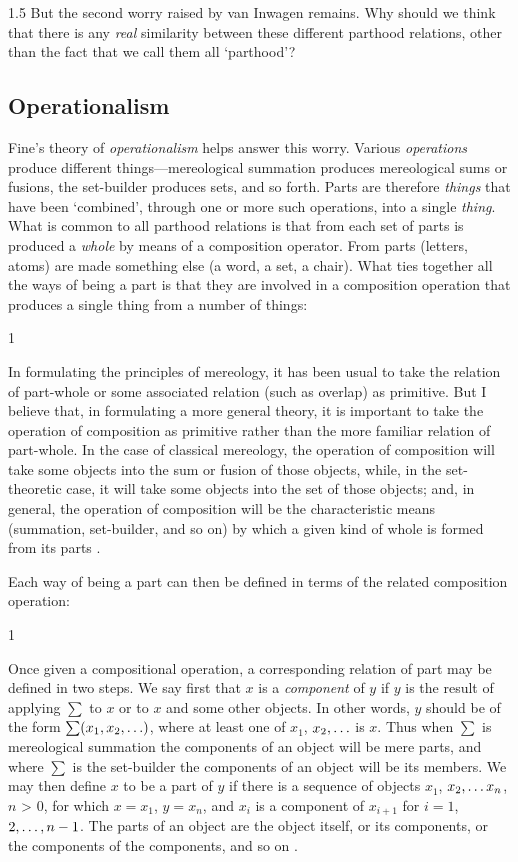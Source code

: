 \documentclass[11pt]{article}
\newenvironment{squote}{%
\begin{spacing}{1}
\begin{list}{}{%
\setlength{\labelwidth}{0pt}%
\rightmargin\leftmargin%
}
\item\relax
}{%
\end{list}%
\end{spacing}
}
\begin{document}
\begin{spacing}{1.5}
But the second worry raised by van Inwagen remains.  Why should we
think that there is any {\em real} similarity between these different
parthood relations, other than the fact that we call them all
`parthood'?

\subsection{Operationalism}
\label{operation}
Fine's theory of {\em operationalism} helps answer this worry.
Various {\em operations} produce different things---mereological
summation produces mereological sums or fusions, the set-builder
produces sets, and so forth.  Parts are therefore {\em things} that
have been `combined', through one or more such operations, into a
single {\em thing}.  What is common to all parthood relations is that
from each set of parts is produced a {\em whole} by means of a
composition operator.  From parts (letters, atoms) are made something
else (a word, a set, a chair).  What ties together all the ways of
being a part is that they are involved in a composition operation that
produces a single thing from a number of things:

\begin{squote}
In formulating the principles of mereology, it has been usual to take
the relation of part-whole or some associated relation (such as
overlap) as primitive.  But I believe that, in formulating a more
general theory, it is important to take the operation of composition
as primitive rather than the more familiar relation of part-whole.  In
the case of classical mereology, the operation of composition will
take some objects into the sum or fusion of those objects, while, in
the set-theoretic case, it will take some objects into the set of
those objects; and, in general, the operation of composition will be
the characteristic means (summation, set-builder, and so on) by which
a given kind of whole is formed from its parts \citep[565]{fine2010}.
\end{squote}

Each way of being a part can then be defined in terms of the related
composition operation:

\begin{squote}
Once given a compositional operation, a corresponding relation of part
may be defined in two steps.  We say first that $x$ is a {\em
  component} of $y$ if $y$ is the result of applying $\sum$ to $x$ or
to $x$ and some other objects.  In other words, $y$ should be of the
form $\sum (x_{1}, x_{2}, \mathellipsis )$, where at least one of
$x_1$, $x_2, \mathellipsis$ is $x$.  Thus when $\sum$ is mereological
summation the components of an object will be mere parts, and where
$\sum$ is the set-builder the components of an object will be its
members.  We may then define $x$ to be a part of $y$ if there is a
sequence of objects $x_1$, $x_2, \mathellipsis x_n$, $n$
\textgreater{} $0$, for which $x = x_1$, $y = x_n$, and $x_i$ is a
component of $x_{i+1}$ for $i = 1$, $2, \mathellipsis, n-1$. The parts
of an object are the object itself, or its components, or the
components of the components, and so on \citep[567--568]{fine2010}.
\end{squote}


\end{spacing}
\end{document}
